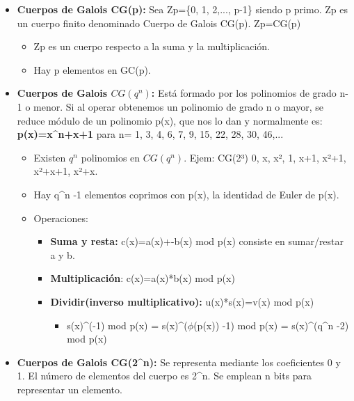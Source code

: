 \documentclass[12pt, twoside, openright]{report} %
\begin{document}
\begin{itemize}
\begin{itemize}
    \end{itemize}
  \item \textbf{Cuerpos de Galois CG(p):} Sea Zp=\{0, 1, 2,..., p-1\} siendo
    p primo. Zp es un cuerpo finito denominado Cuerpo de Galois CG(p).
    Zp=CG(p)
    

    \begin{itemize}
    \item Zp es un cuerpo respecto a la suma y la multiplicación.
      
    \item Hay p elementos en GC(p).
      
    \end{itemize}
  \item \textbf{Cuerpos de Galois $CG(q^n)$:} Está formado por los
    polinomios de grado n-1 o menor. Si al operar obtenemos un polinomio
    de grado n o mayor, se reduce módulo de un polinomio p(x), que nos
    lo dan y normalmente es: \textbf{p(x)=x\^{}n+x+1} para n= 1, 3, 4,
    6, 7, 9, 15, 22, 28, 30, 46,...
    

    \begin{itemize}
    \item Existen $q^n$ polinomios en $CG(q^n)$. Ejem: CG(2³) 0, x, x², 1,
      x+1, x²+1, x²+x+1, x²+x.
      
    \item Hay q\^{}n -1 elementos coprimos con p(x), la identidad de Euler
      de p(x).
      
    \item Operaciones:
      

      \begin{itemize}
      \item \textbf{Suma y resta:} c(x)=a(x)+-b(x) mod p(x) consiste en
        sumar/restar a y b.
        
      \item \textbf{Multiplicación}: c(x)=a(x)*b(x) mod p(x)
        
      \item \textbf{Dividir(inverso multiplicativo):} u(x)*s(x)=v(x) mod
        p(x)
        

        \begin{itemize}
        \item s(x)\^{}(-1) mod p(x) = s(x)\^{}($\phi$(p(x)) -1) mod p(x) =
          s(x)\^{}(q\^{}n -2) mod p(x)
          
        \end{itemize}
      \end{itemize}
    \end{itemize}
  \item \textbf{Cuerpos de Galois CG(2\^{}n):} Se representa mediante los
    coeficientes 0 y 1. El número de elementos del cuerpo es 2\^{}n. Se
    emplean n bits para representar un elemento.
    


\end{itemize}
\end{document}
